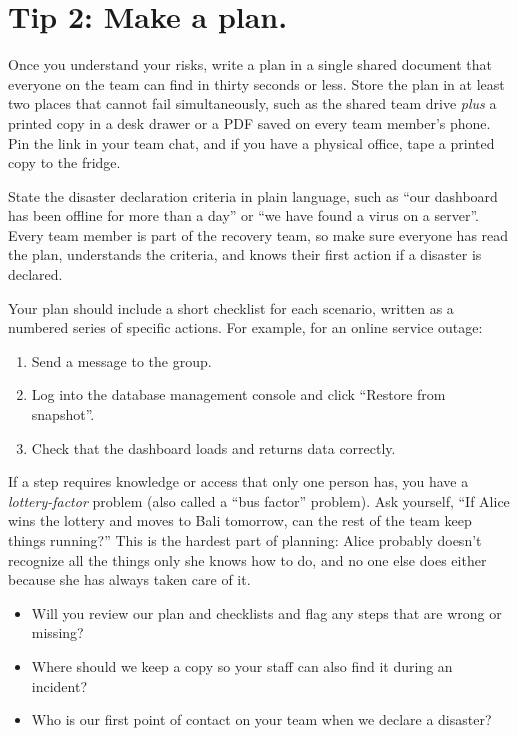 \documentclass[10pt,letterpaper]{article}
\begin{document}
\section*{Tip 2: Make a plan.}

Once you understand your risks, write a plan in a single shared document that
everyone on the team can find in thirty seconds or less. Store the plan in at
least two places that cannot fail simultaneously, such as the shared team drive
\emph{plus} a printed copy in a desk drawer or a PDF saved on every team
member's phone. Pin the link in your team chat, and if you have a physical
office, tape a printed copy to the fridge.

State the disaster declaration criteria in plain language, such as ``our
dashboard has been offline for more than a day'' or ``we have found a virus on a
server''.  Every team member is part of the recovery team, so make sure everyone
has read the plan, understands the criteria, and knows their first action if a
disaster is declared.

Your plan should include a short checklist for each scenario, written as a
numbered series of specific actions. For example, for an online service outage:

\begin{enumerate}
\item Send a message to the  group.
\item Log into the database management console and click ``Restore from snapshot''.
\item Check that the dashboard loads and returns data correctly.
\end{enumerate}

\begin{notebox}
  If a step requires knowledge or access that only one person has, you have a
  \emph{lottery-factor} problem (also called a ``bus factor'' problem). Ask
  yourself, ``If Alice wins the lottery and moves to Bali tomorrow, can the rest
  of the team keep things running?''  This is the hardest part of planning: Alice
  probably doesn't recognize all the things only she knows how to do, and no one
  else does either because she has always taken care of it.
\end{notebox}

\begin{notebox}
  \begin{itemize}
  \item Will you review our plan and checklists and flag any steps that are wrong or missing?
  \item Where should we keep a copy so your staff can also find it during an incident?
  \item Who is our first point of contact on your team when we declare a disaster?
  \end{itemize}
\end{notebox}
\end{document}

